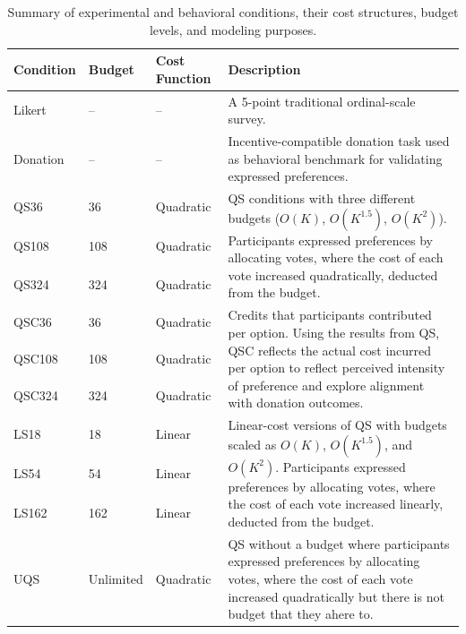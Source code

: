 \begin{table}[h]
    \centering
    \begin{tabular}{@{}lllp{9cm}@{}}
        \toprule
        \textbf{Condition} & \textbf{Budget} & \textbf{Cost Function} & \textbf{Description} \\
        \midrule
        Likert & – & – & A 5-point traditional ordinal-scale survey. \\ 
        \midrule
        Donation & – & – & Incentive-compatible donation task used as behavioral benchmark for validating expressed preferences. \\
        \midrule
        QS36   & 36   & Quadratic & \multirow{3}{9cm}{QS conditions with three different budgets ($O(K)$, $O(K^{1.5})$, $O(K^2)$). Participants expressed preferences by allocating votes, where the cost of each vote increased quadratically, deducted from the budget.} \\
        QS108  & 108  & Quadratic & \\
        QS324  & 324  & Quadratic & \\
        \midrule
        QSC36  & 36   & Quadratic & \multirow{3}{9cm}{Credits that participants contributed per option. Using the results from QS, QSC reflects the actual cost incurred per option to reflect perceived intensity of preference and explore alignment with donation outcomes.} \\
        QSC108 & 108  & Quadratic & \\
        QSC324 & 324  & Quadratic & \\
        \midrule
        LS18   & 18   & Linear    & \multirow{3}{9cm}{Linear-cost versions of QS with budgets scaled as $O(K)$, $O(K^{1.5})$, and $O(K^2)$. Participants expressed preferences by allocating votes, where the cost of each vote increased linearly, deducted from the budget.} \\
        LS54   & 54   & Linear    & \\
        LS162  & 162  & Linear    & \\
        \midrule
        UQS    & Unlimited & Quadratic & QS without a budget where participants expressed preferences by allocating votes, where the cost of each vote increased quadratically but there is not budget that they ahere to. \\
        \bottomrule
    \end{tabular}
    \caption{Summary of experimental and behavioral conditions, their cost structures, budget levels, and modeling purposes.}
    \label{tbl:experiment_cond}
\end{table}

